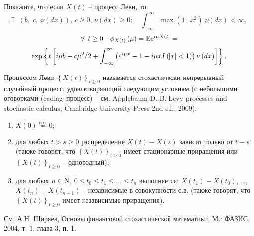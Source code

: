 \begin{problem} \label{sobord} Покажите, что если $X\left( t \right)$ -- 
процесс Леви, то:
\[
\exists \;\;\left( {b,\;c,\;\nu \left( {dx} \right)} \right),\,
c\ge 0,\,\nu \left( {dx} \right)\ge 0:
\quad
\int_{-\infty }^\infty {\max \left( {1,\;x^2} \right)\;}
\nu \left( {dx} 
\right)<\infty ,\]
\[
\forall \;\;t\ge 0 \quad 
\phi _{X\left( t \right)} \left( \mu \right)=\mathbb{E}{\rm e}^{i\mu X\left( t 
\right)}=
\]
\[\exp \left\{ {t\left[ {i\mu b-{c\mu ^2} \mathord{\left/ {\vphantom 
{{c\mu ^2} 2}} \right. \kern-\nulldelimiterspace} 2+\int_{-\infty }^\infty 
{\left( {e^{i\mu x}-1-i\mu xI\left( {\left| x \right|<1} \right)} \right)\nu 
\left( {dx} \right)} } \right]} \right\}.
\]
\end{problem}
\begin{remark}
 Процессом Леви  $\left\{ {X\left( t 
\right)} \right\}_{t\ge 0} $ называется стохастически непрерывный случайный 
процесс, удовлетворяющий следующим условиям (с небольшими оговорками (cadlag--процесс) -- см.  Applebaum D. B. Levy processes and stochastic calculus, Cambridge University Press 2nd ed., 2009):

\begin{enumerate}
\item $X\left( 0 \right)\mathop =\limits^{\text{п.н.}} 0;$
\item для любых $t>s\ge 0$ распределение $X\left( t \right)-X\left( s \right)$ зависит только от $t-s$ (также говорят, что $\left\{ {X\left( t \right)} \right\}_{t\ge 0} $ имеет стационарные приращения или $\left\{ {X\left( t \right)} \right\}_{t\ge 0} $ -- однородный);
\item для любых $n\in {\rm N}$, $0\le t_0 \le t_1 \le ...\le t_n $ выполняется: $X\left( {t_1 } \right)-X\left( {t_0 } \right)$, {\ldots}, $X\left( {t_n } \right)-X\left( {t_{n-1} } \right)$ -- независимые в совокупности с.в. (также говорят, что $\left\{ {X\left( t \right)} \right\}_{t\ge 0} $ имеет независимые приращения).
\end{enumerate}
См. А.Н. Ширяев, Основы финансовой 
стохастической математики, М.: ФАЗИС, 2004, т. 1, глава 3, п. 
1.
\end{remark}

